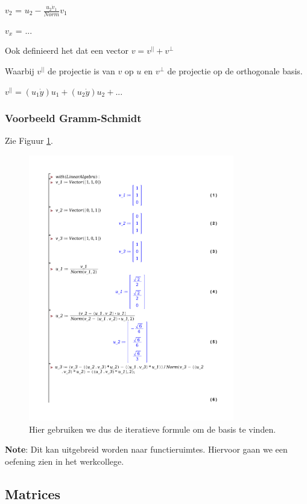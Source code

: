 \documentclass[a4paper]{article}
\begin{document}
$v_2$ = $u_2 - \frac{u_2 \dot v_1}{Norm} v_1$

$v_x$ = ...

Ook definieerd het dat een vector $v = v^{||} + v^{\perp}$

Waarbij $v^{||}$ de projectie is van $v$ op $u$ en $v^{\perp}$ de projectie op de orthogonale basis.

$v^{||} = (u_1 \dot y) u_1 + (u_2 \dot y) u_2 + ...$

\subsubsection{Voorbeeld Gramm-Schmidt}

Zie Figuur \ref{fig:gramm_schmidt}.


\begin{figure}[htbp!]
	\centering
	\includegraphics[width=0.8\textwidth]{./gram.pdf}
	\caption{Hier gebruiken we dus de iteratieve formule om de basis te vinden.}
	\label{fig:gramm_schmidt}
\end{figure}

\textbf{Note}: Dit kan uitgebreid worden naar functieruimtes. Hiervoor gaan we een oefening zien in het werkcollege.

\subsection{Matrices}
\end{document}
